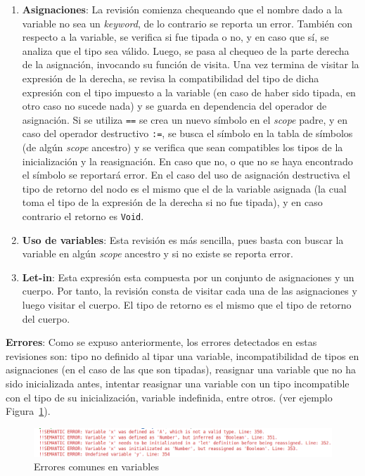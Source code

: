 \documentclass{llncs}
\begin{document}
\begin{enumerate}
    \item \textbf{Asignaciones}: La revisión comienza chequeando que el nombre dado a la variable no sea un \textit{keyword}, de lo contrario se reporta un error. También 
    con respecto a la variable, se verifica si fue tipada o no, y en caso que sí, se analiza que el tipo sea válido. Luego, se pasa al chequeo de la parte derecha de la asignación, 
    invocando su función de visita. Una vez termina de visitar la expresión de la derecha, se revisa la compatibilidad del tipo de dicha expresión con el tipo impuesto a la variable 
    (en caso de haber sido tipada, en otro caso no sucede nada) y se guarda en dependencia del operador de asignación. Si se utiliza \texttt{==} se crea un nuevo símbolo en el
    \textit{scope} padre, y en caso del operador destructivo \texttt{:=}, se busca el símbolo en la tabla de símbolos (de algún \textit{scope} ancestro) y se verifica que sean compatibles 
    los tipos de la inicialización y la reasignación. En caso que no, o que no se haya encontrado el símbolo se reportará error. En el caso del uso de asignación destructiva 
    el tipo de retorno del nodo es el mismo que el de la variable asignada (la cual toma el tipo de la expresión de la derecha si no fue tipada), y en caso contrario el retorno es \texttt{Void}.
    \item \textbf{Uso de variables}: Esta revisión es más sencilla, pues basta con buscar la variable en algún \textit{scope} ancestro y si no existe se reporta error.
    \item \textbf{Let-in}: Esta expresión esta compuesta por un conjunto de asignaciones y un cuerpo. Por tanto, la revisión consta de 
    visitar cada una de las asignaciones y luego visitar el cuerpo. El tipo de retorno es el mismo que el tipo de retorno del cuerpo.
\end{enumerate}

\textbf{Errores}: Como se expuso anteriormente, los errores detectados en estas revisiones son: tipo no definido al tipar una variable, 
incompatibilidad de tipos en asignaciones (en el caso de las que son tipadas), reasignar una variable que no ha sido inicializada antes, intentar reasignar una variable con un tipo incompatible 
con el tipo de su inicialización, variable indefinida, entre otros.  (ver ejemplo Figura~\ref{fig:errores_2}).
\begin{figure}[h]
\centering
\includegraphics[width=1\textwidth]{images/var_errors.png}
\caption{Errores comunes en variables}
\label{fig:errores_2}
\end{figure}
\end{document}
